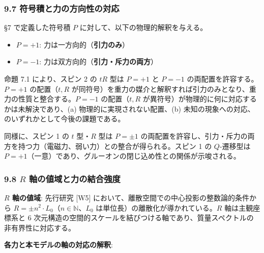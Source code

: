 \documentclass[
  a4paper,11pt]{ltjsarticle}
\providecommand{\tightlist}{%
  \setlength{\itemsep}{0pt}\setlength{\parskip}{0pt}}
\theoremstyle{definition}
\theoremstyle{remark}
\begin{document}
\subsubsection{9.7
符号積と力の方向性の対応}\label{ux7b26ux53f7ux7a4dux3068ux529bux306eux65b9ux5411ux6027ux306eux5bfeux5fdc}

§7 で定義した符号積 \(P\) に対して、以下の物理的解釈を与える。

\begin{itemize}
\tightlist
\item
  \(P = +1\): 力は一方向的（\textbf{引力のみ}）
\item
  \(P = -1\): 力は双方向的（\textbf{引力・斥力の両方}）
\end{itemize}

命題 7.1 により、スピン 2 の \(tR\) 型は \(P = +1\) と \(P = -1\)
の両配置を許容する。\(P = +1\) の配置（\(t, R\)
が同符号）を重力の媒介と解釈すれば引力のみとなり、重力の性質と整合する。\(P = -1\)
の配置（\(t, R\) が異符号）が物理的に何に対応するかは未解決であり、(a)
物理的に実現されない配置、(b)
未知の現象への対応、のいずれかとして今後の課題である。

同様に、スピン 1 の \(t\) 型・\(R\) 型は \(P = \pm 1\)
の両配置を許容し、引力・斥力の両方を持つ力（電磁力、弱い力）との整合が得られる。スピン
1 の \(Q\)-遷移型は
\(P = +1\)（一意）であり、グルーオンの閉じ込め性との関係が示唆される。

\subsubsection{\texorpdfstring{9.8 \(R\)
軸の値域と力の結合強度}{9.8 R 軸の値域と力の結合強度}}\label{r-ux8ef8ux306eux5024ux57dfux3068ux529bux306eux7d50ux5408ux5f37ux5ea6}

\textbf{\(R\) 軸の値域}: 先行研究 {[}W5{]}
において、離散空間での中心投影の整数論的条件から
\(R = \pm n^2 \cdot L_0\)（\(n \in \mathbb{N}\)、\(L_0\)
は単位長）の離散化が導かれている。\(R\) 軸は主観座標系と 6
次元構造の空間的スケールを結びつける軸であり、質量スペクトルの非有界性に対応する。

\textbf{各力と本モデルの軸の対応の解釈}:
\end{document}
